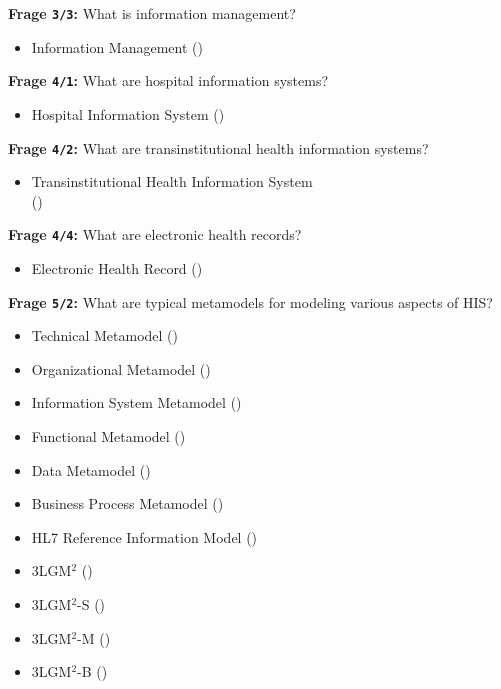 \textbf{Frage \texttt{3/3}:} What is information management?

\begin{itemize}
  \item Information Management ()
\end{itemize}

\textbf{Frage \texttt{4/1}:} What are hospital information systems?

\begin{itemize}
  \item Hospital Information System ()
\end{itemize}

\textbf{Frage \texttt{4/2}:} What are transinstitutional health information systems?

\begin{itemize}
  \item Transinstitutional Health Information System \\
  () %
\end{itemize}

\textbf{Frage \texttt{4/4}:} What are electronic health records?

\begin{itemize}
  \item Electronic Health Record ()
\end{itemize}

\textbf{Frage \texttt{5/2}:} What are typical metamodels for modeling various aspects of HIS?

\begin{itemize}
  \item Technical Metamodel ()
  \item Organizational Metamodel ()
  \item Information System Metamodel ()
  \item Functional Metamodel ()
  \item Data Metamodel ()
  \item Business Process Metamodel ()
  \item HL7 Reference Information Model ()
  \item 3LGM$^{2}$ ()
  \item 3LGM$^{2}$-S ()
  \item 3LGM$^{2}$-M ()
  \item 3LGM$^{2}$-B ()
\end{itemize}

